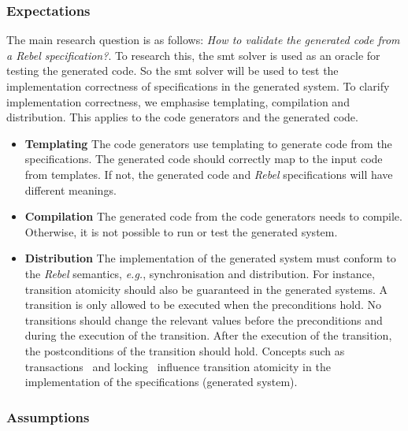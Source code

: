 \subsubsection{Expectations}

The main research question is as follows: \textit{How to validate the generated code
from a Rebel specification?}. To research this, the \gls{smt} solver is used as
an oracle for testing the generated code. So the \gls{smt} solver will be used
to test the implementation correctness of specifications in the generated
system. To clarify implementation correctness, we emphasise templating,
compilation and distribution. This applies to the code generators and the
generated code.

\begin{itemize}
  \item \textbf{Templating} The code generators use templating to generate code
  from the specifications. The generated code should correctly map to the input
  code from templates. If not, the generated code and \textit{Rebel}
  specifications will have different meanings.
  \item \textbf{Compilation} The generated code from the code generators needs
  to compile. Otherwise, it is not possible to run or test the generated system.
  \item \textbf{Distribution} The implementation of the generated system must
  conform to the \textit{Rebel} semantics, \textit{e.g.}, synchronisation and
  distribution. For instance, transition atomicity should also be guaranteed in
  the generated systems. A transition is only allowed to be executed when the
  preconditions hold. No transitions should change the relevant values before
  the preconditions and during the execution of the transition. After the
  execution of the transition, the postconditions of the transition should hold.
  Concepts such as transactions~\cite[p.~6]{tanenbaum2017distributed} and
  locking~\cite[p.~10]{tanenbaum2017distributed} influence transition atomicity
  in the implementation of the specifications (generated system).
\end{itemize}

\subsubsection{Assumptions}

